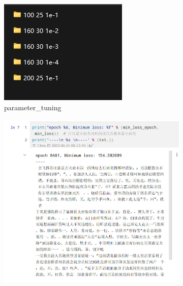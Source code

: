 \documentclass[letterpaper,12pt]{article}
\begin{document}
	\begin{figure}[htbp] 
		\centering 
		\begin{subfigure}{0.3\textwidth}
			\includegraphics[width=\linewidth]{WRNN/parameter_tuning}
			\captionsetup{font=scriptsize}
			\caption{parameter\_tuning}
			\label{fig: WRNN_parameter_tuning}
		\end{subfigure} 
		\begin{subfigure}{0.3\textwidth}
			\includegraphics[width=\linewidth]{WRNN/result_1}

\end{subfigure}
\end{figure}
\end{document}
